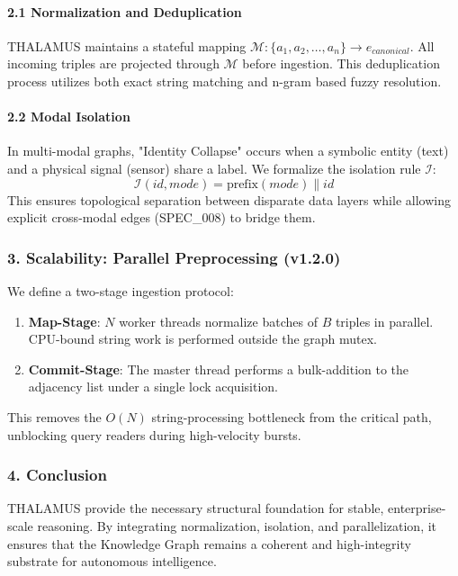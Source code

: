 \paragraph{2.1 Normal\-ization and Dedupl\-ication}
THALAMUS maintains a stateful mapping $\mathcal{M}: \{a_1, a_2, \dots, a_n\} \to e_{canonical}$. All incoming triples are projected through $\mathcal{M}$ before ingestion. This dedup\-lication process \cite{doan2012principles} utilizes both exact string matching and n-gram based fuzzy resolution.

\paragraph{2.2 Modal Isolation}
In multi-modal graphs, "Identity Collapse" occurs when a symbolic entity (text) and a physical signal (sensor) share a label. We formalize the isolation rule $\mathcal{I}$:
\begin{equation}
\mathcal{I}(id, mode) = \text{prefix}(mode) \mathbin{\|} id
\end{equation}
This ensures topological separation between disparate data layers while allowing explicit cross-modal edges (SPEC\_008) to bridge them.

\subsubsection{3. Scalability: Parallel Prepro\-cessing (v1.2.0)}
We define a two-stage ingestion protocol:
\begin{enumerate}
\item \textbf{Map-Stage}: $N$ worker threads normalize batches of $B$ triples in parallel. CPU-bound string work is performed outside the graph mutex.
\item \textbf{Commit-Stage}: The master thread performs a bulk-addition to the adjacency list under a single lock acquisition.
\end{enumerate}
This removes the $O(N)$ string-processing bottleneck from the critical path, unblocking query readers during high-velocity bursts.

\subsubsection{4. Conclusion}
THALAMUS provide the necessary structural foundation for stable, enterprise-scale reasoning. By integrating norma\-lization, isolation, and paral\-lelization, it ensures that the Knowledge Graph remains a coherent and high-integrity substrate for autonomous intel\-ligence.

